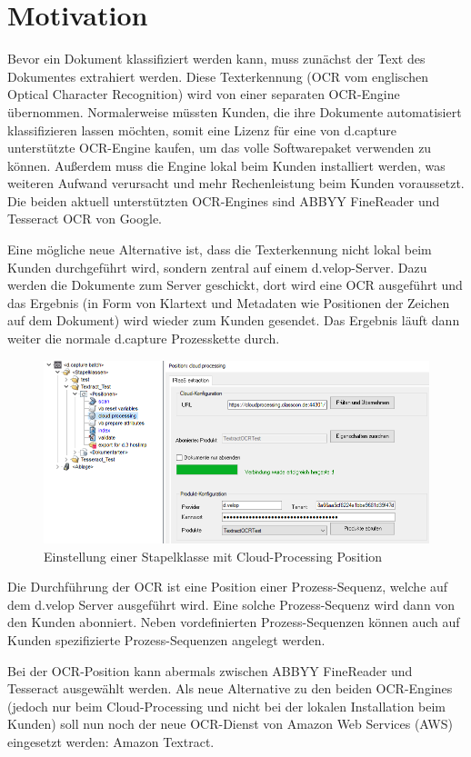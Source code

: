 \documentclass{whswinvcbook}
\begin{document}
\section{Motivation}
Bevor ein Dokument klassifiziert werden kann, muss zunächst der Text des Dokumentes extrahiert werden. Diese Texterkennung (OCR vom englischen Optical Character Recognition) wird von einer separaten OCR-Engine übernommen. Normalerweise müssten Kunden, die ihre Dokumente automatisiert klassifizieren lassen möchten, somit eine Lizenz für eine von d.capture unterstützte OCR-Engine kaufen, um das volle Softwarepaket verwenden zu können. Außerdem muss die Engine lokal beim Kunden installiert werden, was weiteren Aufwand verursacht und mehr Rechenleistung beim Kunden voraussetzt. Die beiden aktuell unterstützten OCR-Engines sind ABBYY FineReader und Tesseract OCR von Google.

Eine mögliche neue Alternative ist, dass die Texterkennung nicht lokal beim Kunden durchgeführt wird, sondern zentral auf einem d.velop-Server. Dazu werden die Dokumente zum Server geschickt, dort wird eine OCR ausgeführt und das Ergebnis (in Form von Klartext und Metadaten wie Positionen der Zeichen auf dem Dokument) wird wieder zum Kunden gesendet. Das Ergebnis läuft dann weiter die normale d.capture Prozesskette durch.
\begin{figure}[H]
    \centering
    \includegraphics[width=1.1\textwidth]{img/textract_cloudprocessing.png}
    \caption{Einstellung einer Stapelklasse mit Cloud-Processing Position}
    \label{fig-textract-cloudprocessing}
\end{figure}
Die Durchführung der OCR ist eine Position einer Prozess-Sequenz, welche auf dem d.velop Server ausgeführt wird. Eine solche Prozess-Sequenz wird dann von den Kunden abonniert. Neben vordefinierten Prozess-Sequenzen können auch auf Kunden spezifizierte Prozess-Sequenzen angelegt werden.

Bei der OCR-Position kann abermals zwischen ABBYY FineReader und Tesseract ausgewählt werden. Als neue Alternative zu den beiden OCR-Engines (jedoch nur beim Cloud-Processing und nicht bei der lokalen Installation beim Kunden) soll nun noch der neue OCR-Dienst von Amazon Web Services (AWS) eingesetzt werden: Amazon Textract.
\end{document}
